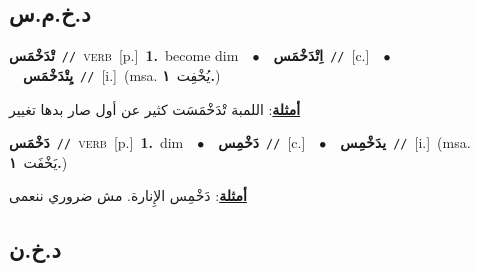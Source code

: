 \documentclass[10pt,a4paper,twoside]{article} %
\begin{document}
\begin{multicols}{2}
\vspace{-3mm}
\subsection*{\color{blue}\foreignlanguage{arabic}{د.خ.م.س}\color{blue}{}} 

{\setlength\topsep{0pt}\textbf{\foreignlanguage{arabic}{تْدَخْمَس}}\ {\color{gray}\texttt{//}\color{black}}\ \textsc{verb}\ [p.]\ \textbf{1.}~become dim\ \ $\bullet$\ \ \setlength\topsep{0pt}\textbf{\foreignlanguage{arabic}{اِتْدَخْمَس}}\ {\color{gray}\texttt{//}\color{black}}\ [c.]\ \ $\bullet$\ \ \setlength\topsep{0pt}\textbf{\foreignlanguage{arabic}{يِتْدَخْمَس}}\ {\color{gray}\texttt{//}\color{black}}\ [i.]\ \color{gray}(msa. \foreignlanguage{arabic}{يُخْفِت}~\foreignlanguage{arabic}{\textbf{١.}})\color{black}\  \begin{flushright}\color{gray}\foreignlanguage{arabic}{\textbf{\underline{\foreignlanguage{arabic}{أمثلة}}}: اللمبة تْدَخْمَسَت كثير عن أول صار بدها تغيير}\end{flushright}\color{black}} \vspace{2mm}

{\setlength\topsep{0pt}\textbf{\foreignlanguage{arabic}{دَخْمَس}}\ {\color{gray}\texttt{//}\color{black}}\ \textsc{verb}\ [p.]\ \textbf{1.}~dim\ \ $\bullet$\ \ \setlength\topsep{0pt}\textbf{\foreignlanguage{arabic}{دَخْمِس}}\ {\color{gray}\texttt{//}\color{black}}\ [c.]\ \ $\bullet$\ \ \setlength\topsep{0pt}\textbf{\foreignlanguage{arabic}{يدَخْمِس}}\ {\color{gray}\texttt{//}\color{black}}\ [i.]\ \color{gray}(msa. \foreignlanguage{arabic}{يَخْفَت}~\foreignlanguage{arabic}{\textbf{١.}})\color{black}\  \begin{flushright}\color{gray}\foreignlanguage{arabic}{\textbf{\underline{\foreignlanguage{arabic}{أمثلة}}}: دَخْمِس الإِنارة. مش ضروري ننعمى}\end{flushright}\color{black}} \vspace{2mm}

\vspace{-3mm}
\subsection*{\color{blue}\foreignlanguage{arabic}{د.خ.ن}\color{blue}{}} 


\end{multicols}
\end{document}
